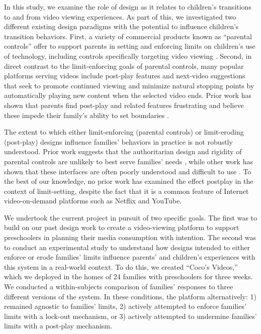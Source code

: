 In this study, we examine the role of design as it relates to
children’s transitions to and from video viewing experiences.
As part of this, we investigated two different existing design
paradigms with the potential to influence children’s transition behaviors. First, a variety of commercial products
known as “parental controls” offer to support parents in setting and enforcing limits on children’s use of technology, including controls specifically targeting video viewing .
Second, in direct contrast to the limit-enforcing goals of parental controls, many popular platforms serving videos include post-play features and next-video suggestions that seek
to promote continued viewing and minimize natural stopping
points by automatically playing new content when the selected video ends. Prior work has shown that parents find
post-play and related features frustrating and believe these
impede their family’s ability to set boundaries .


The extent to which either limit-enforcing (parental controls)
or limit-eroding (post-play) designs influence families’ behaviors in practice is not robustly understood. Prior work
suggests that the authoritarian design and rigidity of parental
controls are unlikely to best serve families’ needs ,
while other work has shown that these interfaces are often
poorly understood and difficult to use . To the best of
our knowledge, no prior work has examined the effect postplay in the context of limit-setting, despite the fact that it is a
common feature of Internet video-on-demand platforms such
as Netflix and YouTube.


We undertook the current project in pursuit of two specific
goals. The first was to build on our past design work to
create a video-viewing platform to support preschoolers in
planning their media consumption with intention. The second was to conduct an experimental study to understand how
designs intended to either enforce or erode families’ limits
influence parents’ and children’s experiences with this system in a real-world context. To do this, we created “Coco’s
Videos,” which we deployed in the homes of 24 families with
preschoolers for three weeks. We conducted a within-subjects comparison of families’ responses to three different versions of the system. In these conditions, the platform alternatively: 1) remained agnostic to families’ limits, 2) actively
attempted to enforce families’ limits with a lock-out mechanism, or 3) actively attempted to undermine families’ limits
with a post-play mechanism.


